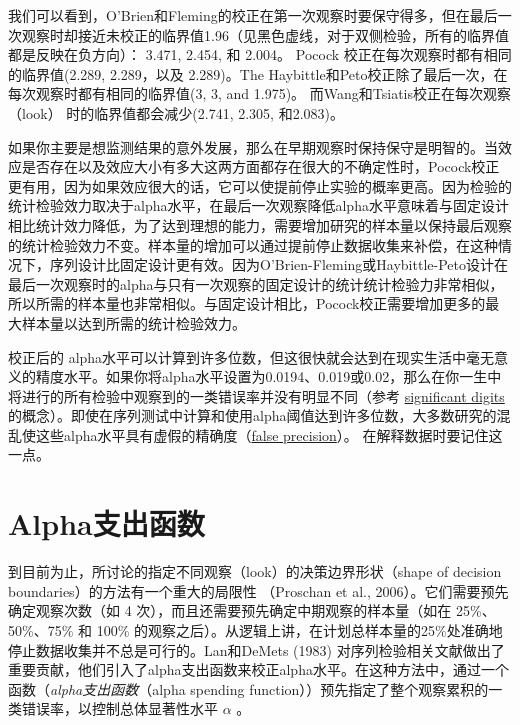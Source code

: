 \documentclass[
  letterpaper,
  DIV=11,
  numbers=noendperiod]{scrreprt}
\begin{document}
我们可以看到，O'Brien和Fleming的校正在第一次观察时要保守得多，但在最后一次观察时却接近未校正的临界值1.96（见黑色虚线，对于双侧检验，所有的临界值都是反映在负方向）：
3.471, 2.454, 和 2.004。 Pocock 校正在每次观察时都有相同的临界值(2.289,
2.289，以及 2.289)。The
Haybittle和Peto校正除了最后一次，在每次观察时都有相同的临界值(3, 3, and
1.975)。 而Wang和Tsiatis校正在每次观察（look） 时的临界值都会减少(2.741,
2.305, 和2.083)。

如果你主要是想监测结果的意外发展，那么在早期观察时保持保守是明智的。当效应是否存在以及效应大小有多大这两方面都存在很大的不确定性时，Pocock校正更有用，因为如果效应很大的话，它可以使提前停止实验的概率更高。因为检验的统计检验效力取决于alpha水平，在最后一次观察降低alpha水平意味着与固定设计相比统计效力降低，为了达到理想的能力，需要增加研究的样本量以保持最后观察的统计检验效力不变。样本量的增加可以通过提前停止数据收集来补偿，在这种情况下，序列设计比固定设计更有效。因为O'Brien-Fleming或Haybittle-Peto设计在最后一次观察时的alpha与只有一次观察的固定设计的统计统计检验力非常相似，所以所需的样本量也非常相似。与固定设计相比，Pocock校正需要增加更多的最大样本量以达到所需的统计检验效力。

校正后的
alpha水平可以计算到许多位数，但这很快就会达到在现实生活中毫无意义的精度水平。如果你将alpha水平设置为0.0194、0.019或0.02，那么在你一生中将进行的所有检验中观察到的一类错误率并没有明显不同（参考
\textquotesingle{}\href{https://en.wikipedia.org/wiki/Significant_figures}{significant
digits}\textquotesingle 的概念）。即使在序列测试中计算和使用alpha阈值达到许多位数，大多数研究的混乱使这些alpha水平具有虚假的精确度（\href{https://en.wikipedia.org/wiki/False_precision}{false
precision}）。 在解释数据时要记住这一点。

\hypertarget{alphaux652fux51faux51fdux6570}{%
\section{Alpha支出函数}\label{alphaux652fux51faux51fdux6570}}

到目前为止，所讨论的指定不同观察（look）的决策边界形状（shape of
decision boundaries）的方法有一个重大的局限性 （Proschan et al.,
2006）。它们需要预先确定观察次数（如 4
次），而且还需要预先确定中期观察的样本量（如在 25\%、50\%、75\% 和 100\%
的观察之后）。从逻辑上讲，在计划总样本量的25\%处准确地停止数据收集并不总是可行的。Lan和DeMets
(1983)
对序列检验相关文献做出了重要贡献，他们引入了alpha支出函数来校正alpha水平。在这种方法中，通过一个函数（\emph{alpha支出函数}（alpha
spending
function））预先指定了整个观察累积的一类错误率，以控制总体显著性水平
\(\alpha\) 。
\end{document}
